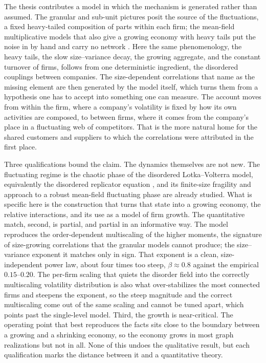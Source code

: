 The thesis contributes a model in which the mechanism is generated rather than assumed. The
granular and sub-unit pictures posit the source of the fluctuations, a fixed heavy-tailed
composition of parts within each firm; the mean-field multiplicative models that also
give a growing economy with heavy tails put the noise in by hand and carry no network
\citep{bouchaudmezard2000}. Here the same phenomenology, the heavy tails, the slow
size--variance decay, the growing aggregate, and the constant turnover of firms, follows
from one deterministic ingredient, the disordered couplings between companies. The
size-dependent correlations that \citet{moran2024} name as the missing element are then
generated by the model itself, which turns them from a hypothesis one has to accept into
something one can measure. The account moves from within the firm, where a company's
volatility is fixed by how its own activities are composed, to between firms, where it
comes from the company's place in a fluctuating web of competitors. That is the more
natural home for the shared customers and suppliers to which the correlations were
attributed in the first place.

Three qualifications bound the claim. The dynamics themselves are not new. The fluctuating
regime is the chaotic phase of the disordered Lotka--Volterra model, equivalently the disordered
replicator equation \citep{diederich1989,bunin2017,galla2018,roy2020}, and its
finite-size fragility and approach to a robust mean-field fluctuating phase are already
studied. What is specific here is the construction that turns that state into a growing
economy, the relative interactions, and its use as a model of firm growth. The
quantitative match, second, is partial, and partial in an informative way. The model
reproduces the order-dependent multiscaling of the higher moments, the signature of
size-growing correlations that the granular models cannot produce; the size--variance
exponent it matches only in sign. That exponent is a clean, size-independent power law,
about four times too steep, $\beta \approx 0.8$ against the empirical $0.15$--$0.20$. The
per-firm scaling that quiets the disorder field into the correctly multiscaling
volatility distribution is also what over-stabilizes the most connected firms and steepens
the exponent, so the steep magnitude and the correct multiscaling come out of the same
scaling and cannot be tuned apart, which points past the single-level model. Third, the
growth is near-critical. The operating point that best reproduces the facts sits close to
the boundary between a growing and a shrinking economy, so the economy grows in most graph
realizations but not in all. None of this undoes the qualitative result, but each
qualification marks the distance between it and a quantitative theory.

